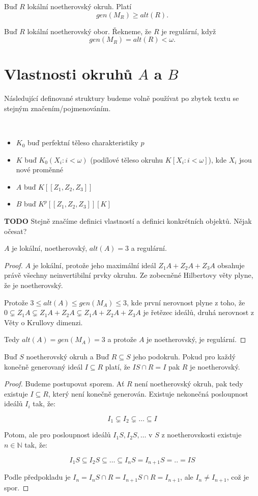 \documentclass[11pt,a4paper]{article}
\newcommand\m[1]{\mathbb { #1 }} %
\newcommand\N{\m N}
\theoremstyle{definition}
\theoremstyle{plain}
\begin{document}
 Buď $R$ lokální noetherovský okruh. Platí
	$$gen(M_R) \geq alt(R).$$

 Buď $R$ lokální noetherovský obor. Řekneme, že $R$ je regulární, když
	$$gen(M_R) = alt(R) < \omega.$$
	
\section{Vlastnosti okruhů $A$ a $B$}
Následující definované struktury budeme volně používat po zbytek textu se
stejným značením/pojmenováním.

 ~\\[-1.5em]
\begin{itemize}
	\item $K_0$ buď perfektní těleso charakteristiky $p$
	\item $K$ buď $K_0(X_i : i < \omega)$ (podílové těleso okruhu $K[X_i : i <
	      \omega]$), kde $X_i$ jsou nové proměnné
	\item $A$ buď $K[[Z_1,Z_2,Z_3]]$
	\item $B$ buď $K^p[[Z_1,Z_2,Z_3]][K]$
\end{itemize}
\textbf{TODO} Stejně značíme definici vlastností a definici konkrétních
objektů. Nějak očesat?


\veta $A$ je lokální, noetherovský, $alt(A) = 3$ a regulární.
\begin{proof}
	$A$ je lokální, protože jeho maximální ideál $Z_1A + Z_2A + Z_3A$ obsahuje
	právě všechny neinvertibilní prvky okruhu. Ze zobecněné Hilbertovy věty
	plyne, že je noetherovský.

	Protože $3 \leq alt(A) \leq gen(M_A) \leq 3$, kde první nerovnost plyne z
	toho, že $0 \subsetneq Z_1A \subsetneq Z_1A + Z_2A \subsetneq Z_1A + Z_2A +
	Z_3A$ je řetězec ideálů, druhá nerovnost z Věty o Krullovy dimenzi.

	Tedy $alt(A) = gen(M_A) = 3$ a protože $A$ je noetherovský, je regulární.
\end{proof}

\lemma Buď $S$ noetherovský okruh a Buď $R \subseteq S$ jeho podokruh. Pokud
pro každý konečně generovaný ideál $I \subseteq R$ platí, že $IS \cap R = I$
pak $R$ je noetherovský.
\begin{proof}
	Budeme postupovat sporem. Ať $R$ není noetherovský okruh, pak tedy existuje
	$I \subseteq R$, který není konečně generován. Existuje nekonečná
	posloupnost ideálů $I_i$ tak, že:

	$$I_1 \subsetneq I_2 \subsetneq \dots \subseteq I$$

	\noindent Potom, ale pro posloupnost ideálů $I_1S, I_2S, \dots$ v $S$ z
	noetherovskosti existuje $n \in \N$ tak, že:

	$$I_1S \subseteq I_2S \subseteq \dots \subseteq I_nS = I_{n+1}S = .. = IS$$

	\noindent Podle předpokladu je $I_n = I_nS \cap R = I_{n+1}S \cap R =
	I_{n+1}$, ale $I_n \not= I_{n+1}$, což je spor.
\end{proof}
\end{document}
